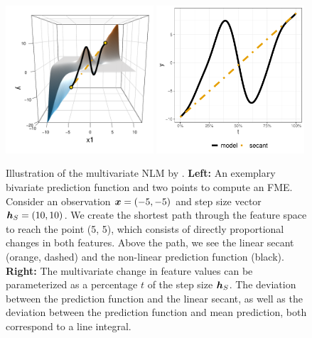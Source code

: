 \begin{figure}[H]
    \centering
    \includegraphics[width = 0.49\textwidth]{figures/fme_geodesic_3d.pdf}
    \includegraphics[width = 0.49\textwidth]{figures/secant_plot.pdf}
    \caption{Illustration of the multivariate NLM by \citet{scholbeck_fme}. \textbf{Left:} An exemplary bivariate prediction function and two points to compute an FME. Consider an observation $\bm{x} = (-5, -5)$ and step size vector $\bm{h}_{S} = (10, 10)$. We create the shortest path through the feature space to reach the point (5, 5), which consists of directly proportional changes in both features. Above the path, we see the linear secant (orange, dashed) and the non-linear prediction function (black). \textbf{Right:} The multivariate change in feature values can be parameterized as a percentage $t$ of the step size $\bm{h}_{S}$. The deviation between the prediction function and the linear secant, as well as the deviation between the prediction function and mean prediction, both correspond to a line integral.}
    \label{fig:nlm_illustration_multivariate}
\end{figure}

